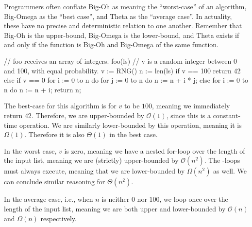 Programmers often conflate Big-Oh as meaning the ``worst-case'' of an algorithm, Big-Omega as the ``best case'', and Theta as the ``average case''. In actuality, these have no precise and deterministic relation to one another. Remember that Big-Oh is the upper-bound, Big-Omega is the lower-bound, and Theta exists if and only if the function is Big-Oh and Big-Omega of the same function.

\begin{verbnobox}[\small]
// foo receives an array of integers.
foo(ls) {
  // v is a random integer between 0 and 100, with equal probability.
  v := RNG()
  n := len(ls)
  if v == 100
    return 42
  else if v == 0
    for i := 0 to n do
      for j := 0 to n do
        n := n + i * j;
  else
    for i := 0 to n do
      n := n + i;
  return n;
}
\end{verbnobox}

The best-case for this algorithm is for $v$ to be $100$, meaning we immediately return $42$. Therefore, we are upper-bounded by $\mathcal{O}(1)$, since this is a constant-time operation. We are similarly lower-bounded by this operation, meaning it is $\Omega{(1)}$. Therefore it is also $\Theta(1)$ in the best case.

In the worst case, $v$ is zero, meaning we have a nested for-loop over the length of the input list, meaning we are (strictly) upper-bounded by $\mathcal{O}(n^2)$. The -loops must always execute, meaning that we are lower-bounded by $\Omega(n^2)$ as well. We can conclude similar reasoning for $\Theta(n^2)$.

In the average case, i.e., when $n$ is neither $0$ nor $100$, we loop once over the length of the input list, meaning we are both upper and lower-bounded by $\mathcal{O}(n)$ and $\Omega(n)$ respectively.


